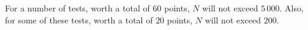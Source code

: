 For a number of tests, worth a total of $60$ points, $N$ will not exceed $5\,000$.
Also, for some of these tests, worth a total of $20$ points, $N$ will not exceed $200$.